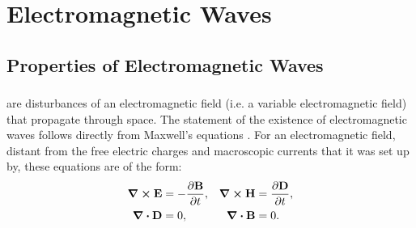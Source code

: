 





\chapter{Electromagnetic Waves}
\label{ch-31}

\section{Properties of Electromagnetic Waves}
\label{sec-31.1} 


\subsection{}\label{31.1.1}  are disturbances of an electromagnetic field (i.e. a variable electromagnetic field) that propagate through space. The statement of the existence of electromagnetic waves follows directly from Maxwell's equations . For an electromagnetic field, distant from the free electric charges  and macroscopic currents  that
it was set up by, these equations are of the form:
\[
\begin{alignedat}{2}
\curl \vb{E} & = - \pdv{\vb{B}}{t}, & \quad \curl \vb{H} & = \pdv{\vb{D}}{t}, \\
\div \vb{D} & = 0,                  & \quad \div \vb{B} & = 0.
\end{alignedat}
\]

